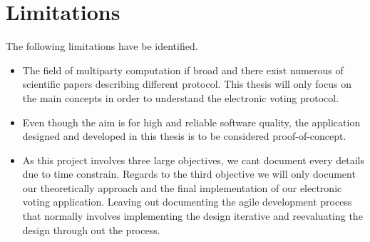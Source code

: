 \section{Limitations}

The following limitations have be identified.

\begin{itemize}
    \item The field of multiparty computation if broad and there exist numerous of scientific papers describing different protocol. This thesis will only focus on the main concepts in order to understand
    the electronic voting protocol. 
    
    \item Even though the aim is for high and reliable software quality, the application designed and developed in this thesis is to be considered proof-of-concept. 
    \item As this project involves three large objectives, we cant document every details due to time constrain. Regards to the third objective we will only document our theoretically approach and the final implementation of our electronic voting application. Leaving out documenting the agile development process that normally involves implementing the design iterative and reevaluating the design through out the process.
\end{itemize}